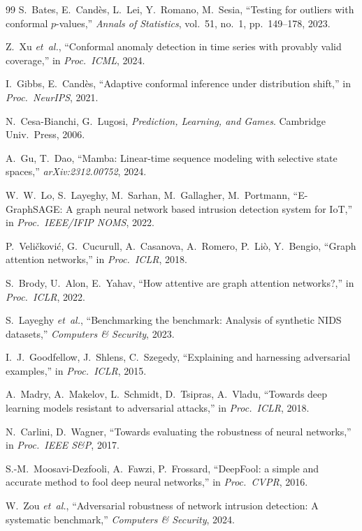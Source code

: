 \documentclass[journal,twoside]{IEEEtran}
\begin{document}
\begin{thebibliography}{99}
S.~Bates, E.~Cand\`es, L.~Lei, Y.~Romano, M.~Sesia,
``Testing for outliers with conformal $p$-values,''
\emph{Annals of Statistics}, vol.~51, no.~1, pp.~149--178, 2023.

Z.~Xu \emph{et~al.},
``Conformal anomaly detection in time series with provably valid
coverage,'' in \emph{Proc.\ ICML}, 2024.

I.~Gibbs, E.~Cand\`es,
``Adaptive conformal inference under distribution shift,'' in
\emph{Proc.\ NeurIPS}, 2021.

N.~Cesa-Bianchi, G.~Lugosi,
\emph{Prediction, Learning, and Games}. Cambridge Univ.\ Press, 2006.

A.~Gu, T.~Dao,
``Mamba: Linear-time sequence modeling with selective state spaces,''
\emph{arXiv:2312.00752}, 2024.

W.~W.~Lo, S.~Layeghy, M.~Sarhan, M.~Gallagher, M.~Portmann,
``E-GraphSAGE: A graph neural network based intrusion detection system
for IoT,'' in \emph{Proc.\ IEEE/IFIP NOMS}, 2022.

P.~Veli\v{c}kovi\'c, G.~Cucurull, A.~Casanova, A.~Romero, P.~Li\`o,
Y.~Bengio,
``Graph attention networks,'' in \emph{Proc.\ ICLR}, 2018.

S.~Brody, U.~Alon, E.~Yahav,
``How attentive are graph attention networks?,'' in
\emph{Proc.\ ICLR}, 2022.

S.~Layeghy \emph{et~al.},
``Benchmarking the benchmark: Analysis of synthetic NIDS datasets,''
\emph{Computers \& Security}, 2023.

I.~J.~Goodfellow, J.~Shlens, C.~Szegedy,
``Explaining and harnessing adversarial examples,'' in
\emph{Proc.\ ICLR}, 2015.

A.~Madry, A.~Makelov, L.~Schmidt, D.~Tsipras, A.~Vladu,
``Towards deep learning models resistant to adversarial attacks,'' in
\emph{Proc.\ ICLR}, 2018.

N.~Carlini, D.~Wagner,
``Towards evaluating the robustness of neural networks,'' in
\emph{Proc.\ IEEE S\&P}, 2017.

S.-M.~Moosavi-Dezfooli, A.~Fawzi, P.~Frossard,
``DeepFool: a simple and accurate method to fool deep neural networks,''
in \emph{Proc.\ CVPR}, 2016.

W.~Zou \emph{et~al.},
``Adversarial robustness of network intrusion detection: A systematic
benchmark,'' \emph{Computers \& Security}, 2024.


\end{thebibliography}
\end{document}
